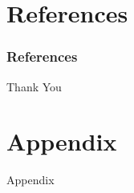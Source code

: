 \documentclass{beamer}
\begin{document}
\section{References}
\begin{frame}[allowframebreaks]
\frametitle{References}\scriptsize


\end{frame}

\begin{frame}
\Huge{\centerline{Thank You}}
\end{frame}

\section{Appendix}
\begin{frame}{Appendix}
\end{frame}
\end{document}
